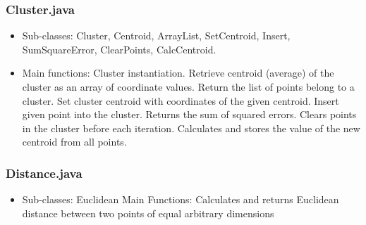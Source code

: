 \documentclass[journal]{IEEEtran}
\begin{document}
\subsubsection{Cluster.java}
\begin{itemize}
	\item Sub-classes: Cluster, Centroid, ArrayList, SetCentroid, Insert, SumSquareError, ClearPoints, CalcCentroid.
	\item Main functions:
	\subitem Cluster instantiation.
	\subitem Retrieve centroid (average) of the cluster as an array of coordinate values.
	\subitem Return the list of points belong to a cluster.
	\subitem Set cluster centroid with coordinates of the given centroid.
	\subitem Insert given point into the cluster.
	\subitem Returns the sum of squared errors.
	\subitem Clears points in the cluster before each iteration.
	\subitem Calculates and stores the value of the new centroid from all points.
\end{itemize}

\subsubsection{Distance.java}
\begin{itemize}
	\item Sub-classes: Euclidean
	\subitem Main Functions:
	\subitem Calculates and returns Euclidean distance between two points of equal arbitrary dimensions
	
\end{itemize}
\end{document}
